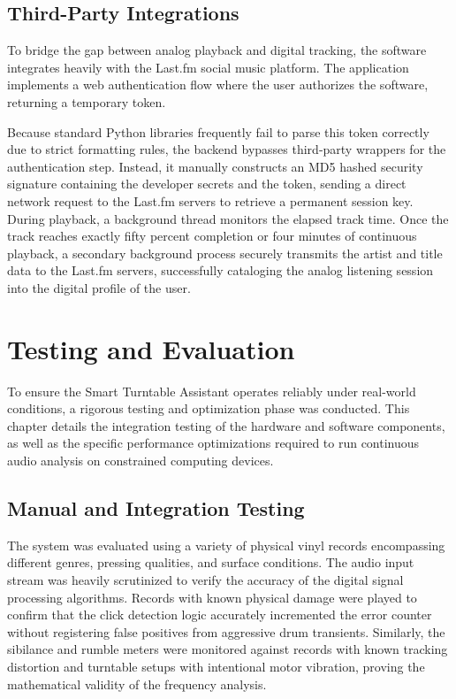 \documentclass[12pt,a4paper,english]{report}
\begin{document}
\section{Third-Party Integrations}

To bridge the gap between analog playback and digital tracking, the software integrates heavily with the Last.fm social music platform. The application implements a web authentication flow where the user authorizes the software, returning a temporary token. 

Because standard Python libraries frequently fail to parse this token correctly due to strict formatting rules, the backend bypasses third-party wrappers for the authentication step. Instead, it manually constructs an MD5 hashed security signature containing the developer secrets and the token, sending a direct network request to the Last.fm servers to retrieve a permanent session key. During playback, a background thread monitors the elapsed track time. Once the track reaches exactly fifty percent completion or four minutes of continuous playback, a secondary background process securely transmits the artist and title data to the Last.fm servers, successfully cataloging the analog listening session into the digital profile of the user.

\chapter{Testing and Evaluation}

To ensure the Smart Turntable Assistant operates reliably under real-world conditions, a rigorous testing and optimization phase was conducted. This chapter details the integration testing of the hardware and software components, as well as the specific performance optimizations required to run continuous audio analysis on constrained computing devices.

\section{Manual and Integration Testing}

The system was evaluated using a variety of physical vinyl records encompassing different genres, pressing qualities, and surface conditions. The audio input stream was heavily scrutinized to verify the accuracy of the digital signal processing algorithms. Records with known physical damage were played to confirm that the click detection logic accurately incremented the error counter without registering false positives from aggressive drum transients. Similarly, the sibilance and rumble meters were monitored against records with known tracking distortion and turntable setups with intentional motor vibration, proving the mathematical validity of the frequency analysis. 
\end{document}
